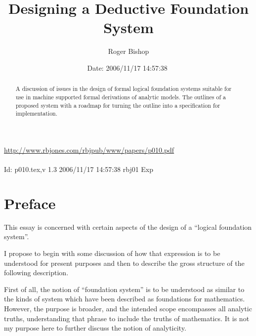 \documentclass[numreferences]{rbjk}
\begin{document}
                                                                                   
\begin{article}
\begin{opening}  
\title{Designing a Deductive Foundation System}
\author{Roger Bishop }
\date{$ $Date: 2006/11/17 14:57:38 $ $}

\begin{abstract}
A discussion of issues in the design of formal logical foundation systems suitable for use in machine supported formal derivations of analytic models.
The outlines of a proposed system with a roadmap for turning the outline into a specification for implementation. 
\end{abstract}
\end{opening}

\vfill

\begin{centering}
\footnotesize{
\href{http://www.rbjones.com/rbjpub/www/papers/p010.pdf}{http://www.rbjones.com/rbjpub/www/papers/p010.pdf}\\
\ \\
$ $Id: p010.tex,v 1.3 2006/11/17 14:57:38 rbj01 Exp $ $\\
}%
\end{centering}

\newpage
\setcounter{tocdepth}{4}
{\parskip-0pt\tableofcontents}

\section{Preface}

This essay is concerned with certain aspects of the design of a ``logical foundation system''.

I propose to begin with some discussion of how that expression is to be understood for present purposes and then to describe the gross structure of the following description.

First of all, the notion of ``foundation system'' is to be understood as similar to the kinds of system which have been described as foundations for mathematics.
However, the purpose is broader, and the intended scope encompasses all analytic truths, understanding that phrase to include the truths of mathematics.
It is not my purpose here to further discuss the notion of analyticity.


\end{article}
\end{document}
